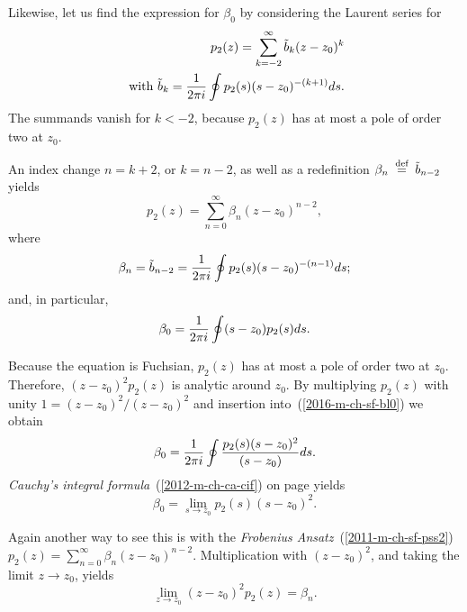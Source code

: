 {Likewise, let us find the expression for $\beta_0$  by considering the Laurent series for
\begin{equation}
\begin{split}
   p_2(z)=\sum_{k=-2}^\infty \tilde b_k(z-z_0)^k \\
\textrm{ with }
   \tilde b_k={1\over 2\pi i}\oint p_2(s)(s-z_0)^{-(k+1)}ds.
\end{split}
\end{equation}
The summands  vanish  for $k<-2$, because $p_2(z)$ has at most a pole of order two at $z_0$.

An index change  $n=k+2$, or  $k=n-2$,  as well as a redefinition
$\beta_n \stackrel{{\tiny \textrm{ def }}}{=} \tilde b_{n-2}$
yields
\begin{equation}
p_2(z) =\sum_{n=0}^\infty \beta_n(z-z_0)^{n-2},
\end{equation}
where
\begin{equation}
 \beta_n={\tilde b}_{n-2}={1\over 2\pi i}
\oint p_2(s)(s-z_0)^{-(n-1)}ds;
\end{equation}
and, in particular,
\begin{equation}
\beta_0={1\over2\pi i}\oint (s-z_0) p_2(s) ds.
\label{2016-m-ch-sf-bl0}
\end{equation}

Because the equation is Fuchsian,  $p_2(z)$ has at most a pole of order two at $z_0$.
Therefore, $(z-z_0)^2 p_2(z)$  is analytic around $z_0$.
By multiplying  $p_2(z)$ with unity $1=(z-z_0)^2/(z-z_0)^2$
and insertion into~(\ref{2016-m-ch-sf-bl0}) we obtain
\begin{equation}
   \beta_0={1\over2\pi i}\oint{p_2(s)(s-z_0)^2\over(s-z_0)}ds .
\end{equation}
{\em Cauchy's integral formula}~(\ref{2012-m-ch-ca-cif}) on page \pageref{2012-m-ch-ca-cif} yields
\begin{equation}
   \beta_0=\lim_{s\to z_0}p_2(s)(s-z_0)^2.
\end{equation}

Again another way to see this is with the
{\it Frobenius Ansatz}~(\ref{2011-m-ch-sf-pss2})   $p_2(z)=\sum_{n=0}^\infty\beta_n(z-z_0)^{n-2}$.
Multiplication with $(z-z_0)^2$, and taking the limit $z\to z_0$, yields
\begin{equation}
   \lim_{z\to z_0}(z-z_0)^2p_2(z)=\beta_n
.
\end{equation}


\eproof
}




